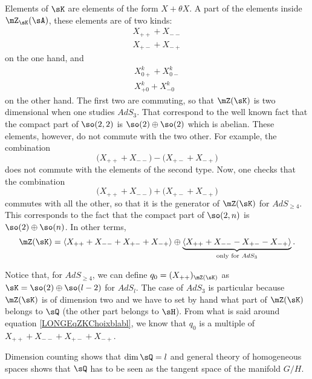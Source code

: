 Elements of $\sK$ are elements of the form $X+\theta X$. A part of the elements inside $\mZ_{\sK}(\sA)$, these elements are of two kinds:
\begin{subequations}
	\begin{align}
		X_{++}+X_{--}\\
		X_{+-}+X_{-+}
	\end{align}
\end{subequations}
on the one hand, and
\begin{subequations}
	\begin{align}
		X^k_{0+}+X^k_{0-}\\
		X^k_{+0}+X^k_{-0}
	\end{align}
\end{subequations}
on the other hand. The first two are commuting, so that $\mZ(\sK)$ is two dimensional when one studies $AdS_3$. That correspond to the well known fact that the compact part of $\so(2,2)$ is $\so(2)\oplus\so(2)$ which is abelian. These elements, however, do not commute with the two other. For example, the combination
\begin{equation}
	\big( X_{++}+X_{--}\big)-\big(X_{+-}+X_{-+}\big)
\end{equation}
does not commute with the elements of the second type. Now, one checks that the combination
\begin{equation}		\label{LONGEqZKChoixblabl}
	\big( X_{++}+X_{--}\big)+\big( X_{+-}+X_{-+})
\end{equation}
commutes with all the other, so that it is the generator of $\mZ(\sK)$ for $AdS_{\geq 4}$. This corresponds to the fact that the compact part of $\so(2,n)$ is $\so(2)\oplus\so(n)$. In other terms,
\begin{equation}		\label{LONGEqDecompZKenDeuxSuivantDim}
	\mZ(\sK)=\langle X_{++}+X_{--}+X_{+-}+X_{-+}\rangle\oplus\underbrace{\langle X_{++}+X_{--}-X_{+-}-X_{-+}\rangle}_{\text{only for $AdS_3$}}.
\end{equation}


Notice that, for $AdS_{\geq 4}$, we can define $q_0=(X_{++})_{\mZ(\sK)}$ as $\sK=\so(2)\oplus\so(l-2)$ for $AdS_l$. The case of $AdS_3$ is particular because $\mZ(\sK)$ is of dimension two and we have to set by hand what part of $\mZ(\sK)$ belongs to $\sQ$ (the other part belongs to $\sH$). From what is said around equation \eqref{LONGEqZKChoixblabl}, we know that $q_0$ is a multiple of $X_{++}+X_{--}+X_{+-}+X_{-+}$.

Dimension counting shows that $\dim\sQ=l$ and general theory of homogeneous spaces shows that $\sQ$ has to be seen as the tangent space of the manifold $G/H$.

